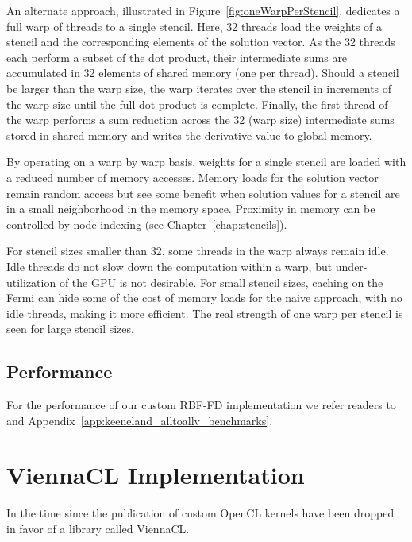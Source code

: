 \documentclass{report}
\begin{document}
An alternate approach, illustrated in Figure~\ref{fig:oneWarpPerStencil}, dedicates a full warp of threads to a single stencil. Here, 32 threads load the weights of a stencil and the corresponding elements of the solution vector. As the 32 threads each perform a subset of the dot product, their intermediate sums are accumulated in 32 elements of shared memory (one per thread).
Should  a stencil be larger than the warp size, the warp iterates over the stencil in increments of the warp size until the full dot product is complete. Finally, the first thread of the warp performs a sum reduction across the 32 (warp size)  intermediate sums stored in shared memory and writes the derivative value to global memory. 

By operating on a warp by warp basis, weights for a single stencil are loaded with a reduced number of memory accesses. Memory loads for the solution vector remain random access but see some benefit when solution values for a stencil are in a small neighborhood in the memory space. Proximity in memory can be controlled by node indexing (see Chapter~\ref{chap:stencils}). 

For stencil sizes smaller than 32, some threads in the warp always remain idle. Idle threads do not slow down the computation within a warp, but under-utilization of the GPU is not desirable. For small stencil sizes, caching on the Fermi can hide some of the cost of memory loads for the naive approach, with no idle threads, making it more efficient. The real strength of one warp per stencil is seen for large stencil sizes. 

\subsection{Performance}
For the performance of our custom RBF-FD implementation we refer readers to \cite{BolligFlyerErlebacher2012} and Appendix~\ref{app:keeneland_alltoallv_benchmarks}. 


\section{ViennaCL Implementation} 


In the time since the publication of \cite{BolligFlyerErlebacher2012} custom OpenCL kernels have been dropped in favor of a library called ViennaCL. 
\end{document}
